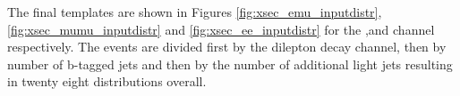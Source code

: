 The final templates are shown in Figures \ref{fig:xsec_emu_inputdistr},\ref{fig:xsec_mumu_inputdistr} and \ref{fig:xsec_ee_inputdistr} for the \emu,\mumu and \ee channel respectively. The events are divided first by the dilepton decay channel, then by number of b-tagged jets and 
then by the number of additional light jets resulting in twenty eight distributions overall.

\begin{figure}[htbp!]
  \begin{center}

\end{center}
\end{figure}
